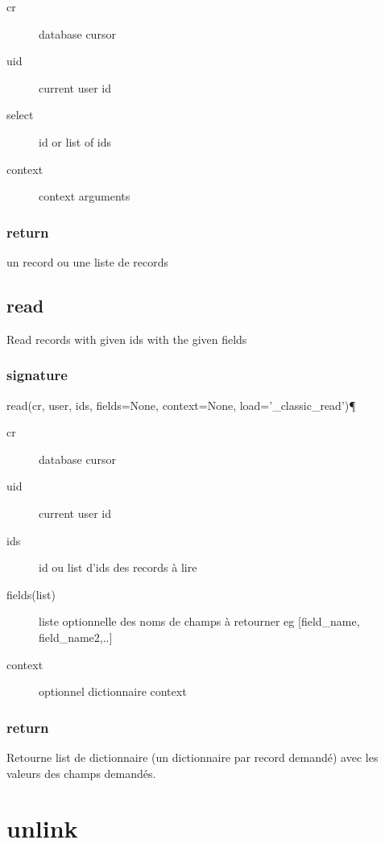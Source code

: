 \documentclass[12pt,a4paper]{article}
\begin{document}
\begin{description}
\item[cr] database cursor
\item[uid] current user id
\item[select] id or list of ids
\item[context] context arguments
\end{description}

\subsubsection{return}
\label{sec:browse_return}

un record ou une liste de records

\subsection{read}
\label{sec:read_method}
Read records with given ids with the given fields
\subsubsection{signature}
\label{sec:read_sig}

 read(cr, user, ids, fields=None, context=None, load='\_classic\_read')¶
\begin{description}
\item[cr] database cursor
\item[uid] current user id
\item[ids] id ou list d'ids des records à lire
\item[fields(list)] liste optionnelle des noms de champs à retourner eg [field\_name, field\_name2,..]
\item[context] optionnel dictionnaire context
\end{description}

\subsubsection{return}
\label{sec:read_return}

Retourne list de dictionnaire (un dictionnaire par record demandé) avec les valeurs des champs demandés.

\section{unlink}
\label{sec:unlink}
\end{document}
